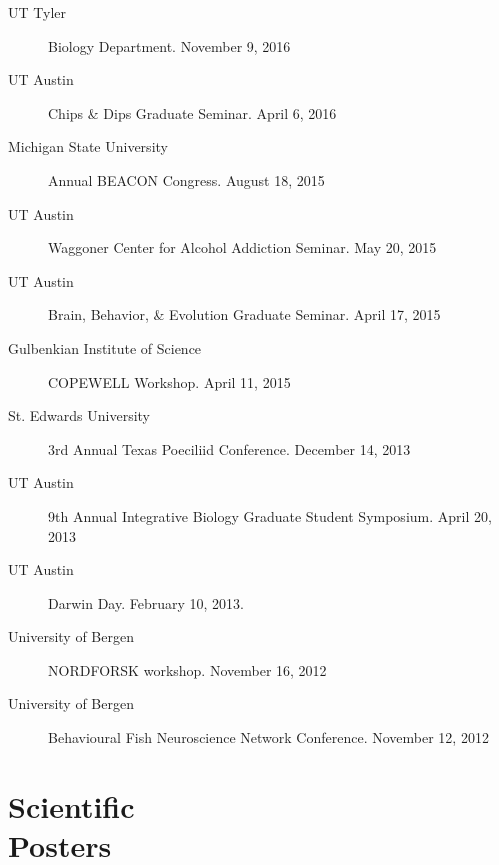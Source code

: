 \documentclass[margin,line]{CV}
\begin{document}
\begin{resume}
\begin{description}
\item[UT Tyler] Biology Department. November 9, 2016
\item[UT Austin] Chips \& Dips Graduate Seminar. April 6, 2016
\item[Michigan State University] Annual BEACON Congress. August 18, 2015 
\item[UT Austin] Waggoner Center for Alcohol Addiction Seminar. May 20, 2015
\item[UT Austin] Brain, Behavior, \& Evolution Graduate Seminar. April 17, 2015
\item[Gulbenkian Institute of Science] COPEWELL Workshop. April 11, 2015
\item[St. Edwards University] 3rd Annual Texas Poeciliid Conference. December 14, 2013 
\item[UT Austin] 9th Annual Integrative Biology Graduate Student Symposium. April 20, 2013
\item[UT Austin] Darwin Day. February 10, 2013.
\item[University of Bergen] NORDFORSK workshop. November 16, 2012
\item[University of Bergen] Behavioural Fish Neuroscience Network Conference. November 12, 2012

\end{description}


\section{\mysidestyle Scientific\\Posters}


\end{resume}
\end{document}
